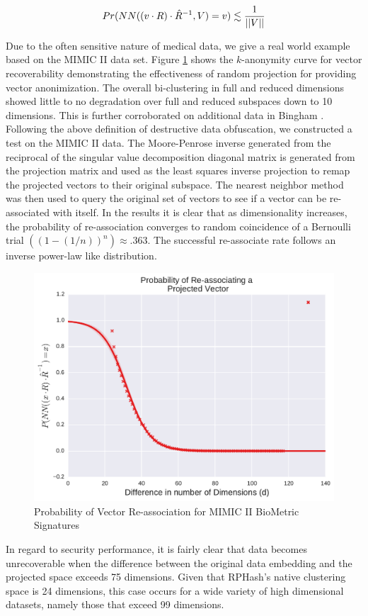 $$
Pr(NN((v\cdot R)\cdot \hat{R}^{-1},V)=v)\lesssim {1\over{||V||}}
$$

Due to the often sensitive nature of medical data, we give a real world example based on the MIMIC
II \cite{MIMICII} data set.  Figure \ref{projrecov} shows the $k$-anonymity curve for vector
recoverability demonstrating the effectiveness of random projection for providing vector
anonimization.  The overall bi-clustering in full and reduced dimensions showed little to no
degradation over full and reduced subspaces down to 10 dimensions.  This is further corroborated on
additional data in Bingham \cite{bingham}.  Following the above definition of destructive data
obfuscation, we constructed a test on the MIMIC II data.  The Moore-Penrose inverse generated from
the reciprocal of the singular value decomposition diagonal matrix is generated from the projection
matrix and used as the least squares inverse projection to remap the projected vectors to their
original subspace.  The nearest neighbor method was then used to query the original set of vectors
to see if a vector can be re-associated with itself.  In the results it is clear that as
dimensionality increases, the probability of re-association converges to random coincidence of a
Bernoulli trial $((1-(1/n))^n) \approx .363$.  The successful re-associate rate follows an inverse
power-law like distribution.

\begin{figure}
\centering
 \includegraphics[width=.7\textwidth]{figs/recovery}
  \caption{Probability of Vector Re-association for MIMIC II BioMetric Signatures}\label{projrecov}
\end{figure}

In regard to security performance, it is fairly clear that data becomes unrecoverable when the
difference between the original data embedding and the projected space exceeds 75 dimensions.  Given
that \textsf{RPHash}'s native clustering space is 24 dimensions, this case occurs for a wide variety of high
dimensional datasets, namely those that exceed 99 dimensions.
